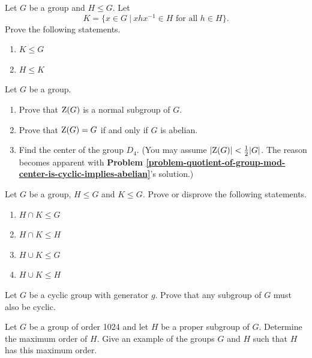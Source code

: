 \begin{problem}
    Let $G$ be a group and $H \leq G$. Let
    \[
        K = \{x \in G \ | \ xhx^{-1} \in H \text{ for all } h \in H \}.
    \]
    Prove the following statements.
    \begin{enumerate}[label=(\alph*)]
        \item $K \leq G$
        \item $H \leq K$
    \end{enumerate}
\end{problem}

\begin{problem}\label{problem-center-of-G}
    Let $G$ be a group.
    \begin{enumerate}[label=(\alph*)]
        \item Prove that $\mathrm{Z}(G)$ is a normal subgroup of $G$.
        \item Prove that $\mathrm{Z}(G) = G$ if and only if $G$ is abelian.
        \item Find the center of the group $D_4$.\newline
        (You may assume $|\mathrm{Z}(G)| < \frac12 |G|$. The reason becomes apparent with \textbf{Problem \ref{problem-quotient-of-group-mod-center-is-cyclic-implies-abelian}}'s solution.)
    \end{enumerate}
\end{problem}

\begin{problem}\label{problem-intersection-of-subgroups}
    Let $G$ be a group, $H \leq G$ and $K \leq G$. Prove or disprove the following statements.
    \begin{enumerate}[label=(\alph*)]
        \item $H \cap K \leq G$
        \item $H \cap K \leq H$
        \item $H \cup K \leq G$
        \item $H \cup K \leq H$
    \end{enumerate}
\end{problem}

\begin{problem}\label{problem-subgroup-of-cyclic-group-is-cyclic}
    Let $G$ be a cyclic group with generator $g$. Prove that any subgroup of $G$ must also be cyclic.
\end{problem}

\begin{problem}
    Let $G$ be a group of order 1024 and let $H$ be a proper subgroup of $G$. Determine the maximum order of $H$. Give an example of the groups $G$ and $H$ such that $H$ has this maximum order.
\end{problem}

